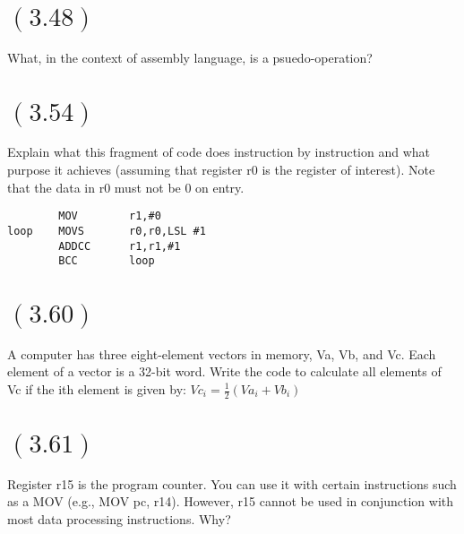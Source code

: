 \documentclass[letterpaper,12pt,titlepage]{article}
\begin{document}
\section*{$(3.48)$} What, in the context of assembly language, is a psuedo-operation?

\begin{mdframed}[style=MyFrame]
\end{mdframed}

\section*{$(3.54)$} Explain what this fragment of code does instruction by instruction and what purpose it achieves (assuming that register r0 is the register of interest). Note that the data in r0 must not be 0 on entry.
\begin{verbatim}
        MOV        r1,#0
loop    MOVS       r0,r0,LSL #1
        ADDCC      r1,r1,#1
        BCC        loop
\end{verbatim}

\begin{mdframed}[style=MyFrame]
\end{mdframed}

\newpage
\section*{$(3.60)$} A computer has three eight-element vectors in memory, Va, Vb, and Vc. Each element of a vector is a 32-bit word. Write the code to calculate all elements of Vc if the ith element is given by: $Vc_i = \frac{1}{2} ( Va_i + Vb_i)$
\begin{mdframed}[style=MyFrame]

\end{mdframed}
\newpage

\section*{$(3.61)$} Register r15 is the program counter. You can use it with certain instructions such as a MOV (e.g., MOV pc, r14). However, r15 cannot be used in conjunction with most data processing instructions. Why?

\begin{mdframed}[style=MyFrame]
\end{mdframed}



\end{document}
